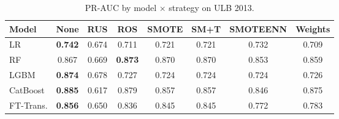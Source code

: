 \begin{table}[H]
\centering
\caption{PR-AUC by model $\times$ strategy on ULB 2013.}
\label{tab:factorial_ulb_prauc}
\begin{tabular}{l c c c c c c c}
\toprule
Model & None & RUS & ROS & SMOTE & SM+T & SMOTEENN & Weights \\
\midrule
LR         & \textbf{0.742} & 0.674 & 0.711 & 0.721 & 0.721 & 0.732 & 0.709 \\
RF         & 0.867 & 0.669 & \textbf{0.873} & 0.870 & 0.870 & 0.853 & 0.859 \\
LGBM       & \textbf{0.874} & 0.678 & 0.727 & 0.724 & 0.724 & 0.724 & 0.726 \\
CatBoost   & \textbf{0.885} & 0.617 & 0.879 & 0.857 & 0.857 & 0.846 & 0.875 \\
FT-Trans.  & \textbf{0.856} & 0.650 & 0.836 & 0.845 & 0.845 & 0.772 & 0.783 \\
\bottomrule
\end{tabular}
\end{table}